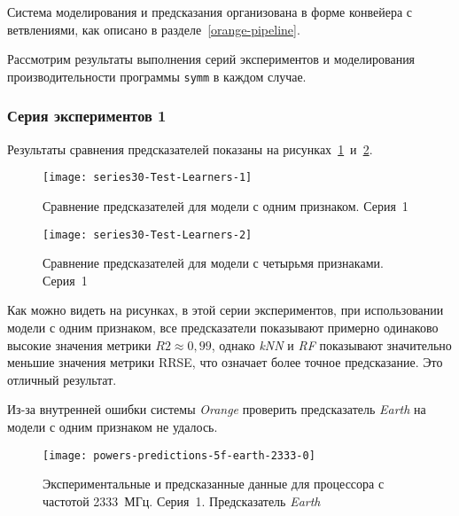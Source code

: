 Система моделирования и предсказания организована в форме конвейера с ветвлениями, как описано в разделе~\ref{orange-pipeline}.

Рассмотрим результаты выполнения серий экспериментов и моделирования производительности программы \texttt{symm} в каждом случае.


\subsubsection{Серия экспериментов 1}

Результаты сравнения предсказателей показаны на рисунках~\ref{img:series30-Test-Learners-1}~и~\ref{img:series30-Test-Learners-2}.

\begin{figure}[tbp]
    \begin{center}
            \texttt{[image: series30-Test-Learners-1]}
            \caption{Сравнение предсказателей для модели с одним признаком. Серия~1} %
            \label{img:series30-Test-Learners-1} %
    \end{center}
\end{figure}

\begin{figure}[tbp]
    \begin{center}
            \texttt{[image: series30-Test-Learners-2]}
            \caption{Сравнение предсказателей для модели с четырьмя признаками. Серия~1}
            \label{img:series30-Test-Learners-2}
    \end{center}
\end{figure}

Как можно видеть на рисунках, в этой серии экспериментов, при использовании модели с одним признаком, все предсказатели показывают примерно одинаково высокие значения метрики $R2 \approx 0,99$, однако \textit{kNN} и \textit{RF} показывают значительно меньшие значения метрики RRSE, что означает более точное предсказание. Это отличный результат.

Из-за внутренней ошибки системы \textit{Orange} проверить предсказатель \textit{Earth} на модели с одним признаком не удалось.

\begin{figure}[tbp]
    \begin{center}
        \texttt{[image: powers-predictions-5f-earth-2333-0]}
        \caption{Экспериментальные и предсказанные данные для процессора с частотой 2333~МГц. Серия~1. Предсказатель \textit{Earth}}
        \label{img:powers-predictions-5f-earth-2333-0}
    \end{center}
\end{figure}

